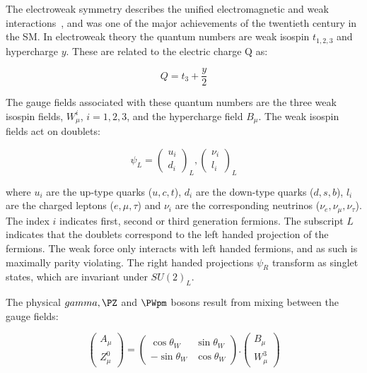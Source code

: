The electroweak symmetry describes the unified electromagnetic and weak
interactions~\cite{GlashowPartialSymmetries,WeinbergModelOfLeptons,SalamNobelSymposium}, 
and was one of the major achievements of the twentieth
century in the \ac{SM}. In electroweak theory the quantum numbers are
weak isospin $t_{1,2,3}$ and hypercharge $y$. These are related to the
electric charge Q as: 

\begin{equation}
Q = t_{3} + \frac{y}{2}
\end{equation}

The gauge fields associated with these quantum numbers are the three weak isospin fields,
$W_{\mu}^{i}$, $i = 1,2,3$, and the hypercharge field $B_{\mu}$. The weak
isospin fields act on doublets: 

\begin{equation}
\psi_{L} =  \begin{pmatrix} u_{i} \\ d_{i} \end{pmatrix}_{L} ,   
\begin{pmatrix} \nu_{i} \\ {l_{i}} \end{pmatrix}_{L}
\end{equation}

where $u_{i}$ are the up-type quarks ($u,c,t$), $d_{i}$ are the down-type quarks
($d,s,b$), $l_{i}$ are the charged leptons ($e,\mu,\tau$) and $\nu_{i}$ are the
corresponding neutrinos ($\nu_{e},\nu_{\mu},\nu_{\tau}$). The index $i$ indicates first, second or third
generation fermions. The subscript $L$ indicates that the doublets correspond to
the left handed projection of the fermions. The weak force only interacts with
left handed fermions, and as such is maximally parity violating. The right
handed projections $\psi_{R}$
transform as singlet states, which are invariant under $SU(2)_{L}$.

The physical $\gamma, \PZ$ and $\PWpm$ bosons result from mixing between the gauge
fields:

\begin{equation}
\begin{pmatrix} A_{\mu} \\ Z_{\mu}^{0} \end{pmatrix} = 
\begin{pmatrix} \cos{\theta_{W}} & \sin{\theta_{W}} \\ -\sin{\theta_{W}} &
\cos{\theta_{W}} \end{pmatrix} . 
\begin{pmatrix} B_{\mu} \\ W_{\mu}^{3} \end{pmatrix}
\end{equation}

